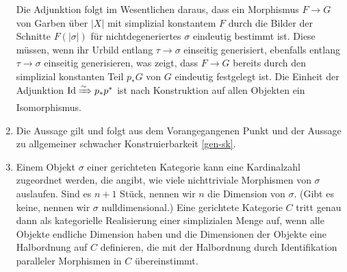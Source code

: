 \begin{enumerate}
  Die Adjunktion folgt im Wesentlichen daraus, dass ein Morphismus $F
  \to G$ von Garben über $|X|$ mit simplizial konstantem $F$ durch die
  Bilder der Schnitte $F(|\sigma|)$ für nichtdegeneriertes $\sigma$
  eindeutig bestimmt ist. Diese müssen, wenn ihr Urbild entlang $\tau
  \to \sigma$ einseitig generisiert, ebenfalls entlang $\tau \to
  \sigma$ einseitig generisieren, was zeigt, dass $F \to G$ bereits
  durch den simplizial konstanten Teil $p_* G$ von $G$ eindeutig
  festgelegt ist. Die Einheit der Adjunktion $\operatorname{Id} \xRightarrow{\sim} p_* p^*$
  ist nach Konstruktion auf allen Objekten ein Isomorphismus.
\item Die Aussage gilt und folgt aus dem Vorangegangenen Punkt und der
  Aussage zu allgemeiner schwacher Konstruierbarkeit \ref{gen-sk}.
\item Einem Objekt $\sigma$ einer gerichteten Kategorie kann eine
  Kardinalzahl zugeordnet werden, die angibt, wie viele nichttriviale
  Morphismen von $\sigma$ auslaufen. Sind es $n+1$ Stück, nennen wir
  $n$ die Dimension von $\sigma$. (Gibt es keine, nennen wir $\sigma$
  nulldimensional.) Eine gerichtete Kategorie $C$ tritt genau dann als
  kategorielle Realisierung einer simplizialen Menge auf, wenn alle
  Objekte endliche Dimension haben und die Dimensionen der Objekte
  eine Halbordnung auf $C$ definieren, die mit der Halbordnung durch
  Identifikation paralleler Morphismen in $C$ übereinstimmt.


\end{enumerate}
